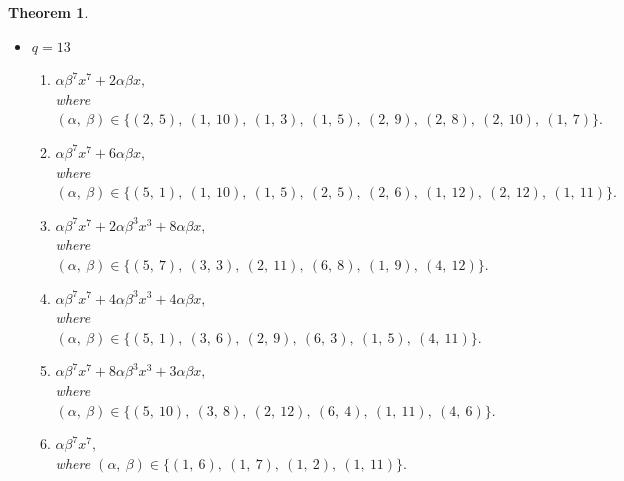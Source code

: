 \documentclass[12pt,a4wide, reqno]{amsart}
\newtheorem{theorem}{Theorem}[section]
\theoremstyle{definition}
\theoremstyle{remark}
\numberwithin{equation}{section}
\begin{document}
\begin{theorem}
\begin{itemize}
\begin{enumerate}[label=\textup{(\arabic*)}]
        $\alpha\beta^7x^7+2\alpha\beta^5x^5+9\alpha\beta^3x^3+9\alpha\beta x,$\\
        where $(\alpha,~\beta)\in\{(1,~1),~(2,~6),~(3,~4),~(4,~3),~(5,~9),~(1,~4),~(2,~2),~(3,~5),~(4,~1),\\~(5,~3)\}.$
        \item 
        $\alpha\beta^7x^7+\alpha\beta^5x^5+5\alpha\beta^3x^3+9\alpha\beta x,$\\
        where $(\alpha,~\beta)\in\{(1,~8),~(2,~4),~(3,~10),~(4,~2),~(5,~6),~(1,~6),~(2,~3),~(3,~2),~(4,~7),\\~(5,~10)\}.$
        \item 
        $\alpha\beta^7x^7+2\alpha\beta^5x^5+9\alpha\beta^3x^3+6\alpha\beta x,$\\
        where $(\alpha,~\beta)\in\{(1,~5),~(2,~8),~(3,~9),~(4,~4),~(5,~1),~(1,~7),~(2,~9),~(3,~6),~(4,~10),\\~(5,~8)\}.$
    \end{enumerate}
    \item 
    $q=13$
    \begin{enumerate}[label=\textup{(\arabic*)}]
     \item 
        $\alpha\beta^7x^7+2\alpha\beta x,$\\
        where $(\alpha,~\beta)\in\{(2,~5),~(1,~10),~(1,~3),~(1,~5),~(2,~9),~(2,~8),~(2,~10),~(1,~7)\}.$
         \item 
        $\alpha\beta^7x^7+6\alpha\beta x,$\\
        where $(\alpha,~\beta)\in\{(5,~1),~(1,~10),~(1,~5),~(2,~5),~(2,~6),~(1,~12),~(2,~12),~(1,~11)\}.$
         \item 
        $\alpha\beta^7x^7+2\alpha\beta^3 x^3+8\alpha\beta x,$\\
        where $(\alpha,~\beta)\in\{(5,~7),~(3,~3),~(2,~11),~(6,~8),~(1,~9),~(4,~12)\}.$
        \item 
        $\alpha\beta^7x^7+4\alpha\beta^3 x^3+4\alpha\beta x,$\\
        where $(\alpha,~\beta)\in\{(5,~1),~(3,~6),~(2,~9),~(6,~3),~(1,~5),~(4,~11)\}.$
        \item 
        $\alpha\beta^7x^7+8\alpha\beta^3 x^3+3\alpha\beta x,$\\
        where $(\alpha,~\beta)\in\{(5,~10),~(3,~8),~(2,~12),~(6,~4),~(1,~11),~(4,~6)\}.$
        \item
        $\alpha\beta^7x^7,$\\
        where $(\alpha,~\beta)\in\{(1,~6),~(1,~7),~(1,~2),~(1,~11)\}.$
    \end{enumerate}

\end{itemize}
\end{theorem}
\end{document}
